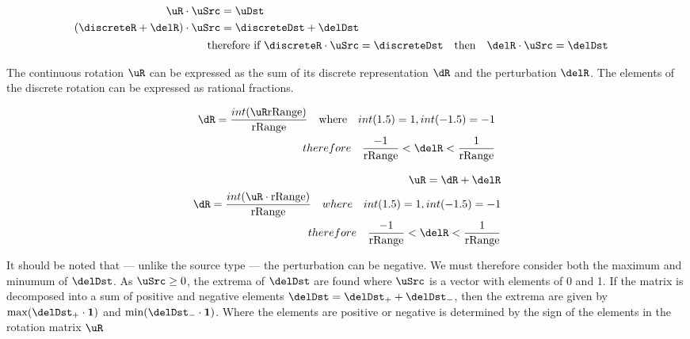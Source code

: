 \newcommand{\tRange}{\text{rRange}}

\begin{eqnarray}\label{eq:lxyPixel}
\begin{aligned}
\uR  \cdot \uSrc &= \uDst  \\
(\discreteR + \delR)  \cdot \uSrc &= \discreteDst + \delDst \\
\end{aligned} \\
\text{therefore if } \discreteR \cdot \uSrc &= \discreteDst \quad \text{then}\quad \delR  \cdot \uSrc = \delDst
\end{eqnarray}

The continuous rotation $\uR$ can be expressed as the sum of its discrete representation $\dR$ and the perturbation $\delR$. The elements of the discrete rotation can be expressed as rational fractions.

\begin{eqnarray}\label{eq:dRot}
\dR = \dfrac{int(\uR \tRange)}{\tRange}\quad \text{where}\quad int(1.5) = 1, int (-1.5) = -1\\
therefore\quad \dfrac{-1}{\tRange} < \delR  < \dfrac{1}{\tRange}
\end{eqnarray}

\begin{eqnarray}\label{eq:dRRange}
\uR = \dR + \delR\\
\dR = \dfrac{int(\uR \cdot \tRange)}{\tRange}\quad where\quad int(1.5) = 1, int (-1.5) = -1\\
therefore\quad \dfrac{-1}{\tRange} < \delR  < \dfrac{1}{\tRange}
\end{eqnarray}

It should be noted that --- unlike the source type \uSrc --- the perturbation can be negative. We must therefore consider both the maximum and minumum of $\delDst$. As $\uSrc \ge 0$, the extrema of $\delDst$ are found where $\uSrc$ is a vector with elements of 0 and 1. If the matrix is decomposed into a sum of positive and negative elements $\delDst = \delDst_+ + \delDst_-$, then the extrema are given by $\max(\delDst_+ \cdot \mathbf{1})$ and $\min(\delDst_- \cdot \mathbf{1})$. Where the elements are positive or negative is determined by the sign of the elements in the rotation matrix $\uR$

